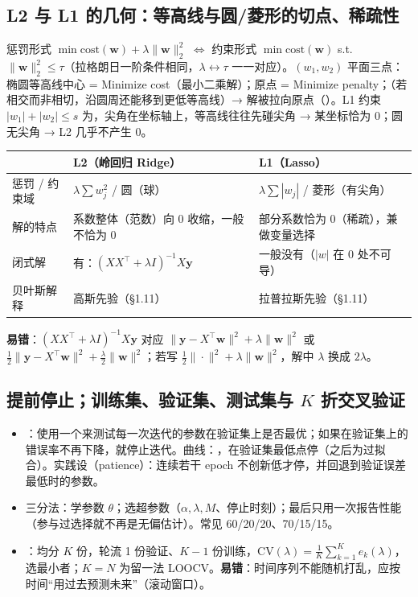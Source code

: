 \subsection{L2 与 L1 的几何：等高线与圆/菱形的切点、稀疏性}
惩罚形式 $\min\text{cost}(\bm w)+\lambda\|\bm w\|_2^2$ $\iff$ 约束形式 $\min\text{cost}(\bm w)$ s.t.\ $\|\bm w\|_2^2\le\tau$（拉格朗日一阶条件相同，$\lambda\leftrightarrow\tau$ 一一对应）。$(w_1,w_2)$ 平面三点：椭圆等高线中心 = Minimize cost（最小二乘解）；原点 = Minimize penalty；（若相交而非相切，沿圆周还能移到更低等高线）→ 解被拉向原点（）。L1 约束 $|w_1|+|w_2|\le s$ 为，尖角在坐标轴上，等高线往往先碰尖角 → 某坐标恰为 0；圆无尖角 → L2 几乎不产生 0。
\begin{center}\small
\begin{tabularx}{\linewidth}{@{}p{1.6cm}p{6.3cm}L@{}}
\toprule
 & L2（岭回归 Ridge）& L1（Lasso）\\
\midrule
惩罚 / 约束域 & $\lambda\sum w_j^2$ / 圆（球）& $\lambda\sum|w_j|$ / 菱形（有尖角）\\
解的特点 & 系数整体（范数）向 0 收缩，一般不恰为 0 & 部分系数恰为 0（稀疏），兼做变量选择 \\
闭式解 & 有：$(XX^\top+\lambda I)^{-1}X\bm y$ & 一般没有（$|w|$ 在 0 处不可导）\\
贝叶斯解释 & 高斯先验（§1.11）& 拉普拉斯先验（§1.11）\\
\bottomrule
\end{tabularx}
\end{center}
\textbf{易错}：$(XX^\top+\lambda I)^{-1}X\bm y$ 对应 $\|\bm y-X^\top\bm w\|^2+\lambda\|\bm w\|^2$ 或 $\frac12\|\bm y-X^\top\bm w\|^2+\frac\lambda2\|\bm w\|^2$；若写 $\frac12\|\cdot\|^2+\lambda\|\bm w\|^2$，解中 $\lambda$ 换成 $2\lambda$。

\subsection{提前停止；训练集、验证集、测试集与 \texorpdfstring{$K$}{K} 折交叉验证}
\begin{itemize}
\item {}：使用一个来测试每一次迭代的参数在验证集上是否最优；如果在验证集上的错误率不再下降，就停止迭代。曲线：，在验证集最低点停（之后为过拟合）。实践设（patience）：连续若干 epoch 不创新低才停，并回退到验证误差最低时的参数。
\item 三分法：学参数 $\theta$；选超参数（$\alpha,\lambda,M$、停止时刻）；最后只用一次报告性能（参与过选择就不再是无偏估计）。常见 60/20/20、70/15/15。
\item {}：均分 $K$ 份，轮流 1 份验证、$K-1$ 份训练，$\mathrm{CV}(\lambda)=\frac1K\sum_{k=1}^Ke_k(\lambda)$，选最小者；$K=N$ 为留一法 LOOCV。\textbf{易错}：时间序列不能随机打乱，应按时间“用过去预测未来”（滚动窗口）。
\end{itemize}


